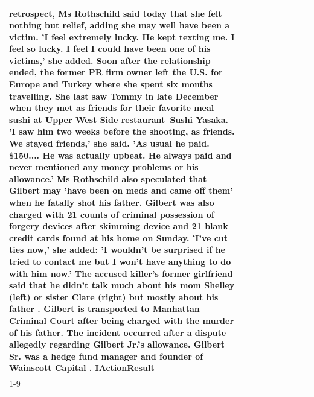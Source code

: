 \begin{table}[H]
\begin{tabular}{lllrlllll}
retrospect, Ms Rothschild said today that she felt nothing but relief, adding she may well have been a victim. 'I feel extremely lucky. He kept texting me. I feel so lucky. I feel I could have been one of his victims,' she added. Soon after the relationship ended, the former PR firm owner left the U.S. for Europe and Turkey where she spent six months  travelling. She last saw Tommy in late December when they met as friends for their favorite meal sushi at Upper West Side restaurant Sushi Yasaka. 'I saw him two weeks before the shooting, as friends. We stayed friends,' she said. 'As usual he paid. \$150.... He was actually upbeat. He always paid and never mentioned any money problems or his allowance.' Ms Rothschild also speculated that Gilbert may 'have been on meds and came off them' when he fatally shot his father. Gilbert was also charged with 21 counts of criminal possession of forgery devices after skimming device and 21 blank credit cards found at his home on Sunday. 'I've cut ties now,' she added: 'I wouldn’t be surprised if he tried to contact me but I won’t have anything to do with him now.' The accused killer's former girlfriend said that he didn't talk much about his mom Shelley (left) or sister Clare (right) but mostly about his father . Gilbert is transported to Manhattan Criminal Court  after being charged with the murder of his father. The incident occurred after a dispute allegedly regarding Gilbert Jr.'s allowance. Gilbert Sr. was a hedge fund manager and founder of Wainscott Capital . IActionResult \\
\cline{1-9} \cline{2-9}

\end{tabular}
\end{table}
